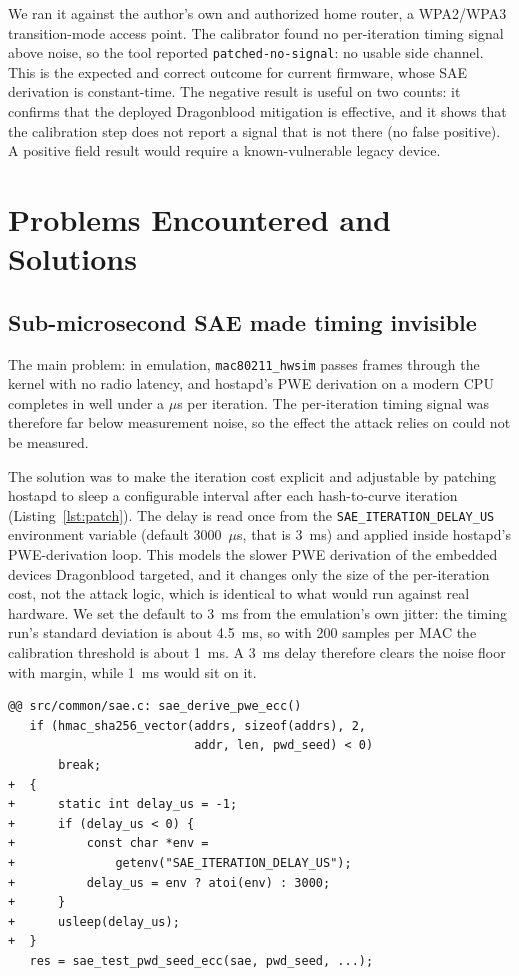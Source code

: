 \documentclass[11pt,letterpaper]{article}
\newcommand{\code}[1]{\texttt{\small #1}}
\begin{document}
We ran it against the author's own and authorized home router, a WPA2/WPA3
transition-mode access point. The calibrator found no per-iteration timing signal
above noise, so the tool reported \code{patched-no-signal}: no usable side
channel. This is the expected and correct outcome for current firmware, whose SAE
derivation is constant-time. The negative result is useful on two counts: it
confirms that the deployed Dragonblood mitigation is effective, and it shows that
the calibration step does not report a signal that is not there (no false
positive). A positive field result would require a known-vulnerable legacy
device.

\section{Problems Encountered and Solutions}
\label{sec:problems}

\subsection{Sub-microsecond SAE made timing invisible}
The main problem: in emulation, \code{mac80211\_hwsim} passes frames through the
kernel with no radio latency, and hostapd's PWE derivation on a modern CPU
completes in well under a $\mu$s per iteration. The per-iteration timing signal
was therefore far below measurement noise, so the effect the attack relies on
could not be measured.

The solution was to make the iteration cost explicit and adjustable by patching
hostapd to sleep a configurable interval after each hash-to-curve iteration
(Listing~\ref{lst:patch}). The delay is read once from the
\code{SAE\_ITERATION\_DELAY\_US} environment variable (default 3000~$\mu$s, that
is 3~ms) and applied inside hostapd's PWE-derivation loop. This models the slower
PWE derivation of the embedded devices Dragonblood targeted, and it changes only
the size of the per-iteration cost, not the attack logic, which is identical to
what would run against real hardware. We set the default to 3~ms from the
emulation's own jitter: the timing run's standard deviation is about 4.5~ms, so
with 200 samples per MAC the calibration threshold is about 1~ms. A 3~ms delay
therefore clears the noise floor with margin, while 1~ms would sit on it.

\begin{lstlisting}[caption={The per-iteration timing delay added to hostapd's
SAE PWE derivation (\code{timing\_delay.patch}).},
label={lst:patch}]
@@ src/common/sae.c: sae_derive_pwe_ecc()
   if (hmac_sha256_vector(addrs, sizeof(addrs), 2,
                          addr, len, pwd_seed) < 0)
       break;
+  {
+      static int delay_us = -1;
+      if (delay_us < 0) {
+          const char *env =
+              getenv("SAE_ITERATION_DELAY_US");
+          delay_us = env ? atoi(env) : 3000;
+      }
+      usleep(delay_us);
+  }
   res = sae_test_pwd_seed_ecc(sae, pwd_seed, ...);
\end{lstlisting}
\end{document}
